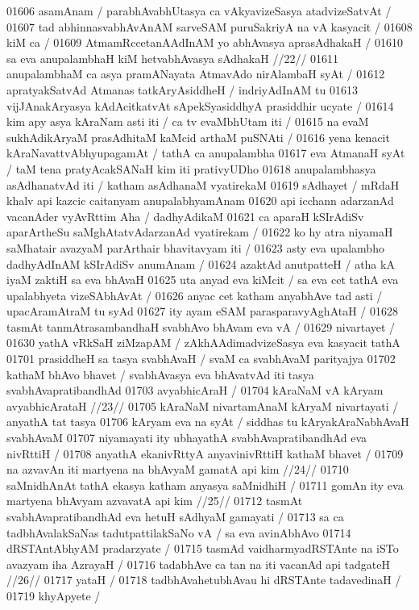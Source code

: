 01606 asamAnam / parabhAvabhUtasya ca vAkyavizeSasya atadvizeSatvAt /
01607 tad abhinnasvabhAvAnAM sarveSAM puruSakriyA na vA kasyacit /
01608 kiM ca /
01609 	AtmamRccetanAAdInAM yo abhAvasya aprasAdhakaH /
01610 	sa eva anupalambhaH kiM hetvabhAvasya sAdhakaH //22//  
01611 anupalambhaM ca asya pramANayata AtmavAdo nirAlambaH syAt /
01612 apratyakSatvAd Atmanas tatkAryAsiddheH / indriyAdInAM tu 
01613 vijJAnakAryasya kAdAcitkatvAt sApekSyasiddhyA prasiddhir ucyate /
01614 kim apy asya kAraNam asti iti / ca tv evaMbhUtam iti /
01615 na evaM sukhAdikAryaM prasAdhitaM kaMcid arthaM puSNAti / 
01616 yena kenacit kAraNavattvAbhyupagamAt / tathA ca anupalambha 
01617 eva AtmanaH syAt / taM tena pratyAcakSANaH kim iti prativyUDho 
01618 anupalambhasya asAdhanatvAd iti / katham asAdhanaM vyatirekaM 
01619 sAdhayet / mRdaH khalv api kazcic caitanyam anupalabhyamAnam
01620 api icchann adarzanAd vacanAder vyAvRttim Aha / dadhyAdikaM 
01621 ca aparaH kSIrAdiSv aparArtheSu saMghAtatvAdarzanAd vyatirekam /
01622 ko hy atra niyamaH saMhatair avazyaM parArthair bhavitavyam iti /  
01623 asty eva upalambho dadhyAdInAM kSIrAdiSv anumAnam /  
01624 azaktAd anutpatteH / atha kA iyaM zaktiH sa eva bhAvaH  
01625 uta anyad eva kiMcit / sa eva cet tathA eva upalabhyeta vizeSAbhAvAt /
01626 anyac cet katham anyabhAve tad asti / upacAramAtraM tu syAd
01627 ity ayam eSAM parasparavyAghAtaH /
01628 	tasmAt tanmAtrasambandhaH svabhAvo bhAvam eva vA /
01629 	nivartayet /  
01630 yathA vRkSaH ziMzapAM / zAkhAAdimadvizeSasya eva kasyacit tathA  
01701 prasiddheH sa tasya svabhAvaH / svaM ca svabhAvaM parityajya
01702 kathaM bhAvo bhavet / svabhAvasya eva bhAvatvAd iti tasya svabhAvapratibandhAd
01703 avyabhicAraH /  
01704 	kAraNaM vA kAryam avyabhicArataH //23//  
01705 kAraNaM nivartamAnaM kAryaM nivartayati / anyathA tat tasya  
01706 kAryam eva na syAt / siddhas tu kAryakAraNabhAvaH svabhAvaM
01707 niyamayati ity ubhayathA svabhAvapratibandhAd eva nivRttiH /  
01708 	anyathA ekanivRttyA anyavinivRttiH kathaM bhavet /  
01709 	na azvavAn iti martyena na bhAvyaM gamatA api kim //24//
01710 	saMnidhAnAt tathA ekasya katham anyasya saMnidhiH /  
01711 	gomAn ity eva martyena bhAvyam azvavatA api kim //25//
01712 tasmAt svabhAvapratibandhAd eva hetuH sAdhyaM gamayati /  
01713 sa ca tadbhAvalakSaNas tadutpattilakSaNo vA / sa eva  avinAbhAvo
01714 dRSTAntAbhyAM pradarzyate /  
01715 	tasmAd vaidharmyadRSTAnte na iSTo avazyam iha AzrayaH /
01716 	tadabhAve ca tan na iti vacanAd api tadgateH //26//  
01717 yataH / 
01718 	tadbhAvahetubhAvau hi dRSTAnte tadavedinaH /
01719 	khyApyete /  

